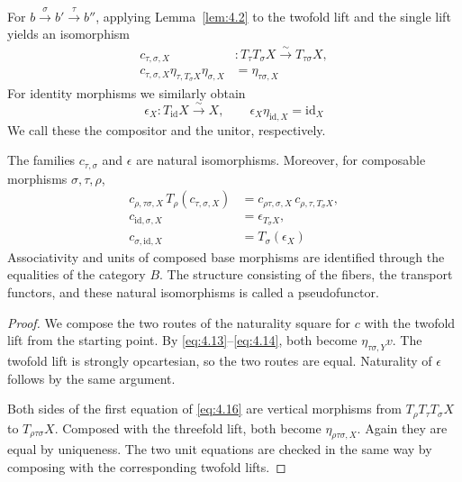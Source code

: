\begin{construction}\label{cons:4.14}

For $b\xrightarrow{\sigma}b'\xrightarrow{\tau}b''$, applying Lemma~\ref{lem:4.2} to the
twofold lift and the single lift yields an isomorphism
\begin{equation*}
\begin{aligned}
c_{\tau,\sigma,X}&:T_\tau T_\sigma X\xrightarrow{\sim}T_{\tau\sigma}X,\\
c_{\tau,\sigma,X}\eta_{\tau,T_\sigma X}\eta_{\sigma,X}
 &=\eta_{\tau\sigma,X}
\end{aligned}
\tag{4.14}\label{eq:4.14}
\end{equation*}
For identity morphisms we similarly obtain
\begin{equation*}
\epsilon_X:T_{\mathrm{id}}X\xrightarrow{\sim}X,\qquad
\epsilon_X\eta_{\mathrm{id},X}=\mathrm{id}_X
\tag{4.15}\label{eq:4.15}
\end{equation*}
We call these the compositor and the unitor, respectively.

\end{construction}

\begin{theorem}\label{thm:4.15}

The families $c_{\tau,\sigma}$ and $\epsilon$ are natural isomorphisms.
Moreover, for composable morphisms $\sigma,\tau,\rho$,
\begin{equation*}
\begin{aligned}
c_{\rho,\tau\sigma,X}\,T_\rho(c_{\tau,\sigma,X})
 &=c_{\rho\tau,\sigma,X}\,c_{\rho,\tau,T_\sigma X},\\
c_{\mathrm{id},\sigma,X}&=\epsilon_{T_\sigma X},\\
c_{\sigma,\mathrm{id},X}&=T_\sigma(\epsilon_X)
\end{aligned}
\tag{4.16}\label{eq:4.16}
\end{equation*}
Associativity and units of composed base morphisms are identified through the equalities
of the category $B$.
The structure consisting of the fibers, the transport functors, and these natural
isomorphisms is called a pseudofunctor.

\end{theorem}

\begin{proof}

We compose the two routes of the naturality square for $c$ with the twofold lift from the
starting point.
By \eqref{eq:4.13}--\eqref{eq:4.14}, both become $\eta_{\tau\sigma,Y}v$.
The twofold lift is strongly opcartesian, so the two routes are equal.
Naturality of $\epsilon$ follows by the same argument.

Both sides of the first equation of \eqref{eq:4.16} are vertical morphisms from
$T_\rho T_\tau T_\sigma X$ to $T_{\rho\tau\sigma}X$.
Composed with the threefold lift, both become $\eta_{\rho\tau\sigma,X}$.
Again they are equal by uniqueness. The two unit equations are checked in the same way by
composing with the corresponding twofold lifts.

\end{proof}

